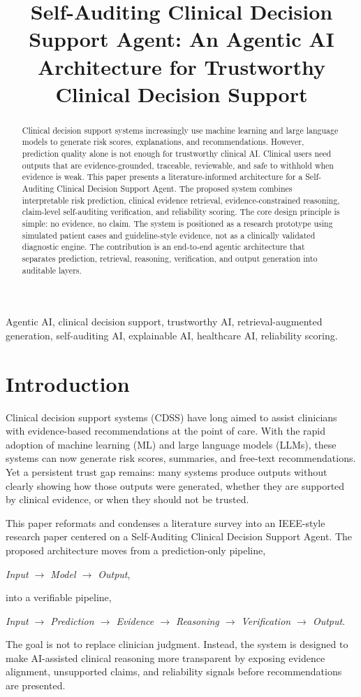 \documentclass[conference]{IEEEtran}
\title{Self-Auditing Clinical Decision Support Agent: An Agentic AI Architecture for Trustworthy Clinical Decision Support}
\author{\IEEEauthorblockN{Bhargav Boyapati}
\IEEEauthorblockA{University of Texas at Arlington\\
Arlington, Texas, USA\\
Email: bhargavboyapati2602@gmail.com}}
\begin{document}
\maketitle
\begin{abstract}
Clinical decision support systems increasingly use machine learning and large language models to generate risk scores, explanations, and recommendations. However, prediction quality alone is not enough for trustworthy clinical AI. Clinical users need outputs that are evidence-grounded, traceable, reviewable, and safe to withhold when evidence is weak. This paper presents a literature-informed architecture for a Self-Auditing Clinical Decision Support Agent. The proposed system combines interpretable risk prediction, clinical evidence retrieval, evidence-constrained reasoning, claim-level self-auditing verification, and reliability scoring. The core design principle is simple: no evidence, no claim. The system is positioned as a research prototype using simulated patient cases and guideline-style evidence, not as a clinically validated diagnostic engine. The contribution is an end-to-end agentic architecture that separates prediction, retrieval, reasoning, verification, and output generation into auditable layers.
\end{abstract}

\begin{IEEEkeywords}
Agentic AI, clinical decision support, trustworthy AI, retrieval-augmented generation, self-auditing AI, explainable AI, healthcare AI, reliability scoring.
\end{IEEEkeywords}

\section{Introduction}
Clinical decision support systems (CDSS) have long aimed to assist clinicians with evidence-based recommendations at the point of care. With the rapid adoption of machine learning (ML) and large language models (LLMs), these systems can now generate risk scores, summaries, and free-text recommendations. Yet a persistent trust gap remains: many systems produce outputs without clearly showing how those outputs were generated, whether they are supported by clinical evidence, or when they should not be trusted.

This paper reformats and condenses a literature survey into an IEEE-style research paper centered on a Self-Auditing Clinical Decision Support Agent. The proposed architecture moves from a prediction-only pipeline,
\begin{center}
\textit{Input $\rightarrow$ Model $\rightarrow$ Output},
\end{center}
into a verifiable pipeline,
\begin{center}
\textit{Input $\rightarrow$ Prediction $\rightarrow$ Evidence $\rightarrow$ Reasoning $\rightarrow$ Verification $\rightarrow$ Output}.
\end{center}
The goal is not to replace clinician judgment. Instead, the system is designed to make AI-assisted clinical reasoning more transparent by exposing evidence alignment, unsupported claims, and reliability signals before recommendations are presented.
\end{document}
